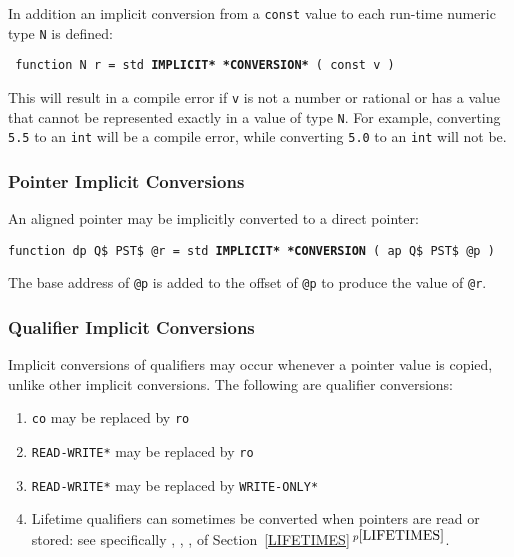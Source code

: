 \documentclass[12pt]{article}
\newcommand{\ttkey}[1]{{\tt \bfseries #1}}
\newcommand{\itemref}[1]{\ref{#1}$\,^{p\pageref{#1}}$}
\newenvironment{indpar}[1][0.3in]%
	{\begin{list}{}%
		     {\setlength{\itemsep}{0in}%
		      \setlength{\topsep}{0in}%
		      \setlength{\parsep}{1ex}%
		      \setlength{\labelwidth}{#1}%
		      \setlength{\leftmargin}{#1}%
		      \addtolength{\leftmargin}{\labelsep}}%
	 \item}%
	{\end{list}}
\begin{document}
In addition an implicit conversion from a {\tt const} value
to each run-time numeric type {\tt N} is defined:
\begin{indpar} \tt
function N r = std \ttkey{*IMPLICIT* *CONVERSION*} ( const v )
\end{indpar}
This will result in a compile error if {\tt v} is not a number
or rational or has a value that cannot be represented
exactly in a value of type {\tt N}.
For example, converting {\tt 5.5} to an {\tt int} will be a compile
error, while converting {\tt 5.0} to an {\tt int} will not be.

\subsubsection{Pointer Implicit Conversions}
\label{POINTER-IMPLICIT-CONVERSIONS}

An aligned pointer may be implicitly converted to a direct pointer:

\begin{indpar}
{\tt function dp Q\$ PST\$ @r =
    std \ttkey{*IMPLICIT* *CONVERSION} ( ap Q\$ PST\$ @p )}
\begin{indpar}
The base address of {\tt @p} is added to the offset of {\tt @p} to
produce the value of {\tt @r}.
\end{indpar}
\end{indpar}

\subsubsection{Qualifier Implicit Conversions}
\label{QUALIFIER-IMPLICIT-CONVERSIONS}

Implicit conversions of qualifiers may occur whenever a pointer
value is copied, unlike other implicit conversions.
The following are qualifier conversions:
\begin{indpar}
\begin{enumerate}
\item {\tt co} may be replaced by {\tt ro}
\item {\tt *READ-WRITE*} may be replaced by {\tt ro}
\item {\tt *READ-WRITE*} may be replaced by {\tt *WRITE-ONLY*}
\item Lifetime qualifiers can sometimes be converted when pointers are read or
stored: see specifically
\GlobalToHeap,
\UndeclaredToGlobalOrHeap,
\GlobalOrHeapToUndeclared,
\AnyToOutOfLineUndeclared{}
of Section~\itemref{LIFETIMES}.

\end{enumerate}
\end{indpar}
\end{document}
